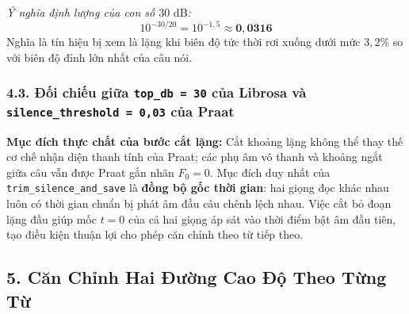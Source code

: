 \documentclass[11pt,a4paper]{article}
\begin{document}
\textit{Ý nghĩa định lượng của con số $30\text{ dB}$:}
\[
10^{-30/20} = 10^{-1{,}5} \approx \mathbf{0{,}0316}
\]
Nghĩa là tín hiệu bị xem là lặng khi biên độ tức thời rơi xuống dưới mức \textbf{$3{,}2\%$} so với biên độ đỉnh lớn nhất của câu nói.

\subsubsection*{4.3. Đối chiếu giữa \texttt{top\_db = 30} của Librosa và \texttt{silence\_threshold = 0,03} của Praat}

\begin{table}[H]
\centering
\small
{}
\caption{So sánh bản chất giữa việc cắt lặng bằng Librosa và ngưỡng lặng của Praat.}
\label{tab:silence_comparison}
\end{table}

\noindent\textbf{Mục đích thực chất của bước cắt lặng:} Cắt khoảng lặng không thể thay thế cơ chế nhận diện thanh tính của Praat; các phụ âm vô thanh và khoảng ngắt giữa câu vẫn được Praat gắn nhãn $F_0 = 0$. Mục đích duy nhất của \texttt{trim\_silence\_and\_save} là \textbf{đồng bộ gốc thời gian}: hai giọng đọc khác nhau luôn có thời gian chuẩn bị phát âm đầu câu chênh lệch nhau. Việc cắt bỏ đoạn lặng đầu giúp mốc $t = 0$ của cả hai giọng áp sát vào thời điểm bật âm đầu tiên, tạo điều kiện thuận lợi cho phép căn chỉnh theo từ tiếp theo.

\subsection*{5. Căn Chỉnh Hai Đường Cao Độ Theo Từng Từ}
\end{document}
